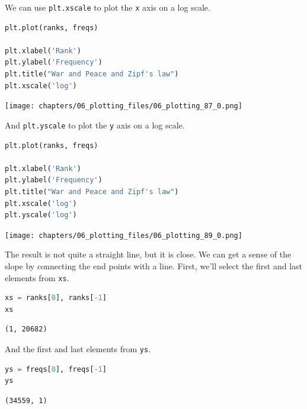 We can use \passthrough{\lstinline!plt.xscale!} to plot the
\passthrough{\lstinline!x!} axis on a log scale.

\begin{lstlisting}[language=Python,style=source]
plt.plot(ranks, freqs)

plt.xlabel('Rank')
plt.ylabel('Frequency')
plt.title("War and Peace and Zipf's law")
plt.xscale('log')
\end{lstlisting}

\begin{center}
\texttt{[image: chapters/06\_plotting\_files/06\_plotting\_87\_0.png]}
\end{center}

And \passthrough{\lstinline!plt.yscale!} to plot the
\passthrough{\lstinline!y!} axis on a log scale.

\begin{lstlisting}[language=Python,style=source]
plt.plot(ranks, freqs)

plt.xlabel('Rank')
plt.ylabel('Frequency')
plt.title("War and Peace and Zipf's law")
plt.xscale('log')
plt.yscale('log')
\end{lstlisting}

\begin{center}
\texttt{[image: chapters/06\_plotting\_files/06\_plotting\_89\_0.png]}
\end{center}

The result is not quite a straight line, but it is close. We can get a
sense of the slope by connecting the end points with a line. First,
we'll select the first and last elements from
\passthrough{\lstinline!xs!}.

\begin{lstlisting}[language=Python,style=source]
xs = ranks[0], ranks[-1]
xs
\end{lstlisting}

\begin{lstlisting}[style=output]
(1, 20682)
\end{lstlisting}

And the first and last elements from \passthrough{\lstinline!ys!}.

\begin{lstlisting}[language=Python,style=source]
ys = freqs[0], freqs[-1]
ys
\end{lstlisting}

\begin{lstlisting}[style=output]
(34559, 1)
\end{lstlisting}

